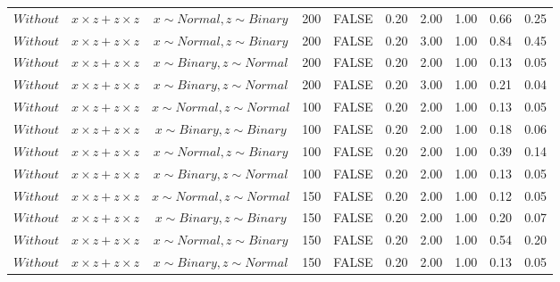 \begin{longtable}{lccccccccc}
  $Without$ & $\textit{x} \times \textit{z} + \textit{z} \times \textit{z}$ & $\textit{x} \sim Normal, \textit{z} \sim Binary$ & 200 & FALSE & 0.20 & 2.00 & 1.00 & 0.66 & 0.25 \\ 
  $Without$ & $\textit{x} \times \textit{z} + \textit{z} \times \textit{z}$ & $\textit{x} \sim Normal, \textit{z} \sim Binary$ & 200 & FALSE & 0.20 & 3.00 & 1.00 & 0.84 & 0.45 \\ 
  $Without$ & $\textit{x} \times \textit{z} + \textit{z} \times \textit{z}$ & $\textit{x} \sim Binary, \textit{z} \sim Normal$ & 200 & FALSE & 0.20 & 2.00 & 1.00 & 0.13 & 0.05 \\ 
  $Without$ & $\textit{x} \times \textit{z} + \textit{z} \times \textit{z}$ & $\textit{x} \sim Binary, \textit{z} \sim Normal$ & 200 & FALSE & 0.20 & 3.00 & 1.00 & 0.21 & 0.04 \\ 
  $Without$ & $\textit{x} \times \textit{z} + \textit{z} \times \textit{z}$ & $\textit{x} \sim Normal , \textit{z} \sim Normal$ & 100 & FALSE & 0.20 & 2.00 & 1.00 & 0.13 & 0.05 \\ 
  $Without$ & $\textit{x} \times \textit{z} + \textit{z} \times \textit{z}$ & $\textit{x} \sim Binary, \textit{z} \sim Binary$ & 100 & FALSE & 0.20 & 2.00 & 1.00 & 0.18 & 0.06 \\ 
  $Without$ & $\textit{x} \times \textit{z} + \textit{z} \times \textit{z}$ & $\textit{x} \sim Normal, \textit{z} \sim Binary$ & 100 & FALSE & 0.20 & 2.00 & 1.00 & 0.39 & 0.14 \\ 
  $Without$ & $\textit{x} \times \textit{z} + \textit{z} \times \textit{z}$ & $\textit{x} \sim Binary, \textit{z} \sim Normal$ & 100 & FALSE & 0.20 & 2.00 & 1.00 & 0.13 & 0.05 \\ 
  $Without$ & $\textit{x} \times \textit{z} + \textit{z} \times \textit{z}$ & $\textit{x} \sim Normal , \textit{z} \sim Normal$ & 150 & FALSE & 0.20 & 2.00 & 1.00 & 0.12 & 0.05 \\ 
  $Without$ & $\textit{x} \times \textit{z} + \textit{z} \times \textit{z}$ & $\textit{x} \sim Binary, \textit{z} \sim Binary$ & 150 & FALSE & 0.20 & 2.00 & 1.00 & 0.20 & 0.07 \\ 
  $Without$ & $\textit{x} \times \textit{z} + \textit{z} \times \textit{z}$ & $\textit{x} \sim Normal, \textit{z} \sim Binary$ & 150 & FALSE & 0.20 & 2.00 & 1.00 & 0.54 & 0.20 \\ 
  $Without$ & $\textit{x} \times \textit{z} + \textit{z} \times \textit{z}$ & $\textit{x} \sim Binary, \textit{z} \sim Normal$ & 150 & FALSE & 0.20 & 2.00 & 1.00 & 0.13 & 0.05 \\ 

\end{longtable}
